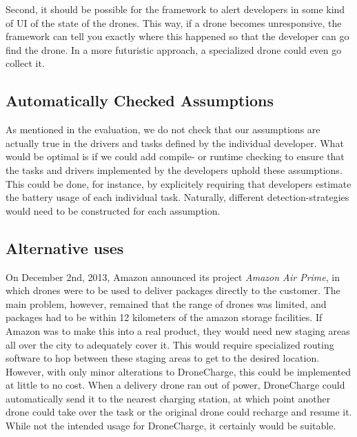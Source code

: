 Second, it should be possible for the framework to alert developers in some kind of UI of the state of the drones. This way, if a drone becomes unresponsive, the framework can tell you exactly where this happened so that the developer can go find the drone. In a more futuristic approach, a specialized drone could even go collect it.

\subsection{Automatically Checked Assumptions}
As mentioned in the evaluation, we do not check that our assumptions are actually true in the drivers and tasks defined by the individual developer. What would be optimal is if we could add compile- or runtime checking to ensure that the tasks and drivers implemented by the developers uphold these assumptions. This could be done, for instance, by explicitely requiring that developers estimate the battery usage of each individual task. Naturally, different detection-strategies would need to be constructed for each assumption.

\subsection{Alternative uses}
On December 2nd, 2013, Amazon announced its project \textit{Amazon Air Prime}, in which drones were to be used to deliver packages directly to the customer. The main problem, however, remained that the range of drones was limited, and packages had to be within 12 kilometers of the amazon storage facilities. If Amazon was to make this into a real product, they would need new staging areas all over the city to adequately cover it. This would require specialized routing software to hop between these staging areas to get to the desired location. However, with only minor alterations to DroneCharge, this could be implemented at little to no cost. When a delivery drone ran out of power, DroneCharge could automatically send it to the nearest charging station, at which point another drone could take over the task or the original drone could recharge and resume it. While not the intended usage for DroneCharge, it certainly would be suitable.